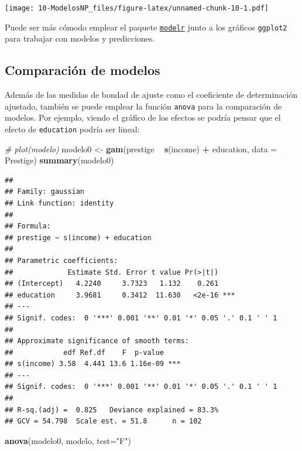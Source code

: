 \documentclass[]{book}
\newenvironment{Shaded}{\begin{snugshade}}{\end{snugshade}}
\newcommand{\CommentTok}[1]{\textcolor[rgb]{0.56,0.35,0.01}{\textit{#1}}}
\newcommand{\DataTypeTok}[1]{\textcolor[rgb]{0.13,0.29,0.53}{#1}}
\newcommand{\KeywordTok}[1]{\textcolor[rgb]{0.13,0.29,0.53}{\textbf{#1}}}
\newcommand{\NormalTok}[1]{#1}
\newcommand{\OperatorTok}[1]{\textcolor[rgb]{0.81,0.36,0.00}{\textbf{#1}}}
\newcommand{\StringTok}[1]{\textcolor[rgb]{0.31,0.60,0.02}{#1}}
\begin{document}
\texttt{[image: 10-ModelosNP\_files/figure-latex/unnamed-chunk-10-1.pdf]}

Puede ser más cómodo emplear el paquete \href{https://github.com/hadley/modelr}{\texttt{modelr}} junto a los gráficos \texttt{ggplot2} para trabajar con modelos y predicciones.

\hypertarget{comparacion-de-modelos}{%
\subsection{Comparación de modelos}\label{comparacion-de-modelos}}

Además de las medidas de bondad de ajuste como el coeficiente de determinación ajustado, también se puede emplear la función \texttt{anova} para la comparación de modelos.
Por ejemplo, viendo el gráfico de los efectos se podría pensar que el efecto de \texttt{education} podría ser lineal:

\begin{Shaded}
\begin{Highlighting}[]
\CommentTok{# plot(modelo)}
\NormalTok{modelo0 <-}\StringTok{ }\KeywordTok{gam}\NormalTok{(prestige }\OperatorTok{~}\StringTok{ }\KeywordTok{s}\NormalTok{(income) }\OperatorTok{+}\StringTok{ }\NormalTok{education, }\DataTypeTok{data =}\NormalTok{ Prestige)}
\KeywordTok{summary}\NormalTok{(modelo0)}
\end{Highlighting}
\end{Shaded}

\begin{verbatim}
## 
## Family: gaussian 
## Link function: identity 
## 
## Formula:
## prestige ~ s(income) + education
## 
## Parametric coefficients:
##             Estimate Std. Error t value Pr(>|t|)    
## (Intercept)   4.2240     3.7323   1.132    0.261    
## education     3.9681     0.3412  11.630   <2e-16 ***
## ---
## Signif. codes:  0 '***' 0.001 '**' 0.01 '*' 0.05 '.' 0.1 ' ' 1
## 
## Approximate significance of smooth terms:
##            edf Ref.df    F  p-value    
## s(income) 3.58  4.441 13.6 1.16e-09 ***
## ---
## Signif. codes:  0 '***' 0.001 '**' 0.01 '*' 0.05 '.' 0.1 ' ' 1
## 
## R-sq.(adj) =  0.825   Deviance explained = 83.3%
## GCV = 54.798  Scale est. = 51.8      n = 102
\end{verbatim}

\begin{Shaded}
\begin{Highlighting}[]
\KeywordTok{anova}\NormalTok{(modelo0, modelo, }\DataTypeTok{test=}\StringTok{"F"}\NormalTok{)}
\end{Highlighting}
\end{Shaded}
\end{document}

